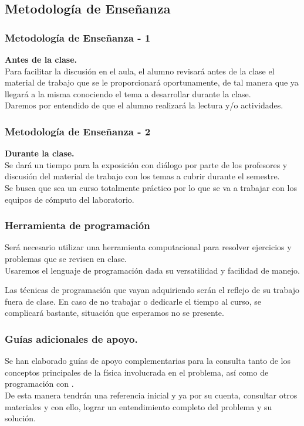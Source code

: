 \subsection{Metodología de Enseñanza}
\begin{frame}
\frametitle{Metodología de Enseñanza - 1}
\textbf{Antes de la clase.}
\\
\medskip
Para facilitar la discusión en el aula, el alumno revisará antes de la clase el material de trabajo que se le proporcionará oportunamente, de tal manera que ya llegará a la misma conociendo el tema a desarrollar durante la clase.
\\
\bigskip
Daremos por entendido de que el alumno realizará la lectura y/o actividades.
\end{frame}
\begin{frame}	
\frametitle{Metodología de Enseñanza - 2}
\textbf{Durante la clase.}
\\
\medskip
Se dará un tiempo para la exposición con diálogo por parte de los profesores y discusión del material de trabajo con los temas a cubrir durante el semestre.
\\
\bigskip
Se busca que sea un curso totalmente práctico por lo que se va a trabajar con los equipos de cómputo del laboratorio.
\end{frame}
\begin{frame}
\frametitle{Herramienta de programación}
Será necesario utilizar una herramienta computacional para resolver ejercicios y problemas que se revisen en clase.
\\
\bigskip
Usaremos el lenguaje de programación \textoazul{\python} dada su versatilidad y facilidad de manejo.
\end{frame}
\begin{frame}
Las técnicas de programación que vayan adquiriendo serán el reflejo de su trabajo fuera de clase. En caso de no trabajar o dedicarle el tiempo al curso, se complicará bastante, situación que esperamos no se presente.
\end{frame}
\begin{frame}
\frametitle{Guías adicionales de apoyo.}
Se han elaborado guías de apoyo complementarias para la consulta tanto de los conceptos principales de la física involucrada en el problema, así como de programación con \textoazul{\python}.
\\
\bigskip
De esta manera tendrán una referencia inicial y ya por su cuenta, consultar otros materiales y con ello, lograr un entendimiento completo del problema y su solución.
\end{frame}
